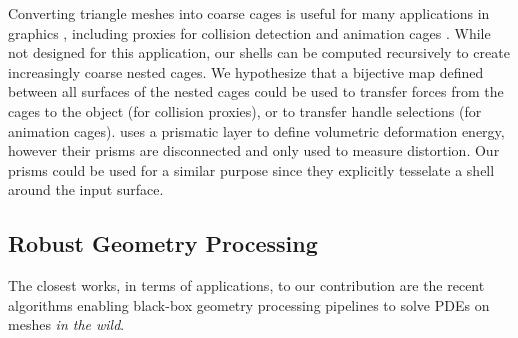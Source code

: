 Converting triangle meshes into coarse cages is useful for many applications in graphics \cite{sacht2015nested}, including proxies for collision detection \cite{Calderon:2017} and animation cages \cite{Thiery:2012}. While not designed for this application, our shells can be computed recursively to create increasingly coarse nested cages. We hypothesize that a bijective map defined between all surfaces of the nested cages could be used to transfer forces from the cages to the object (for collision proxies), or to transfer handle selections (for animation cages).  uses a prismatic layer to define volumetric deformation energy, however their prisms are disconnected and only used to measure distortion. Our prisms could be used for a similar purpose since they explicitly tesselate a shell around the input surface. %

\subsection{Robust Geometry Processing}

The closest works, in terms of applications, to our contribution are the recent algorithms enabling black-box geometry processing pipelines to solve PDEs on meshes \emph{in the wild}. 



